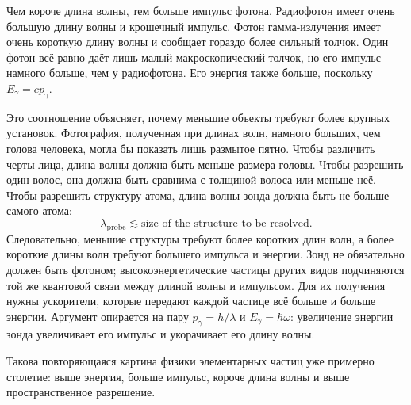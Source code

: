 \begin{classroomqa}
\end{classroomqa}

Чем короче длина волны, тем больше импульс фотона. Радиофотон имеет очень большую длину волны и крошечный импульс. Фотон гамма-излучения имеет очень короткую длину волны и сообщает гораздо более сильный толчок. Один фотон всё равно даёт лишь малый макроскопический толчок, но его импульс намного больше, чем у радиофотона. Его энергия также больше, поскольку \(E_\gamma=cp_\gamma\).

Это соотношение объясняет, почему меньшие объекты требуют более крупных установок. Фотография, полученная при длинах волн, намного больших, чем голова человека, могла бы показать лишь размытое пятно. Чтобы различить черты лица, длина волны должна быть меньше размера головы. Чтобы разрешить один волос, она должна быть сравнима с толщиной волоса или меньше неё. Чтобы разрешить структуру атома, длина волны зонда должна быть не больше самого атома:
\begin{equation}
\lambda_{\mathrm{probe}}\lesssim
\text{size of the structure to be resolved}.
\end{equation}
Следовательно, меньшие структуры требуют более коротких длин волн, а более короткие длины волн требуют большего импульса и энергии. Зонд не обязательно должен быть фотоном; высокоэнергетические частицы других видов подчиняются той же квантовой связи между длиной волны и импульсом. Для их получения нужны ускорители, которые передают каждой частице всё больше и больше энергии. Аргумент опирается на пару \(p_\gamma=h/\lambda\) и \(E_\gamma=\hbar\omega\): увеличение энергии зонда увеличивает его импульс и укорачивает его длину волны.

Такова повторяющаяся картина физики элементарных частиц уже примерно столетие: выше энергия, больше импульс, короче длина волны и выше пространственное разрешение.

\begin{classroomqa}
\end{classroomqa}

